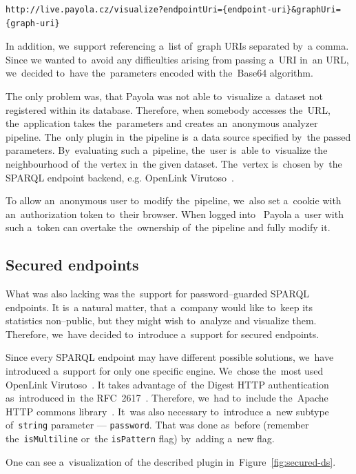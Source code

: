 {  \scriptsize
\begin{verbatim}
http://live.payola.cz/visualize?endpointUri={endpoint-uri}&graphUri={graph-uri}
\end{verbatim}
}

In addition, we~support referencing a~list of~graph URIs separated by~a comma. Since 
we wanted to~avoid any difficulties arising from passing a~URI in~an 
URL, we~decided to~have the~parameters encoded with the~Base64 algorithm.

The only problem was, that Payola was not able to~visualize a~dataset not registered
within its database. Therefore, when somebody accesses the~URL, the~application takes the~parameters and creates an~anonymous analyzer 
pipeline. The~only plugin in~the pipeline is~a data source specified by~the 
passed parameters. By~evaluating such a~pipeline, the~user is~able to~visualize 
the neighbourhood of~the vertex in~the given dataset. The~vertex is~chosen by~the 
SPARQL endpoint backend, e.g. OpenLink Virutoso~\cite{virtuoso}.

To allow an~anonymous user to~modify the~pipeline, we~also set a~cookie with an~authorization token to~their browser. When logged into~ 
Payola a~user with such a~token can overtake the~ownership of~the pipeline and 
fully modify it.

\subsection{Secured endpoints}
What was also lacking was the~support for password--guarded SPARQL endpoints. 
It is~a natural matter, that a~company would like to~keep its statistics 
non--public, but they might wish to~analyze and visualize them. Therefore, we~have decided to~introduce a~support for secured endpoints.

Since every SPARQL endpoint may have different possible solutions, we~have 
introduced a~support for only one specific engine. We~chose the~most
used OpenLink Virutoso~\cite{virtuoso}.
It takes advantage of~the Digest HTTP authentication as~introduced in~the 
RFC~2617~\cite{rfc-2617}. Therefore, we~had to~include the~Apache HTTP commons 
library~\cite{apache-http-commons}. It~was also necessary to~introduce a~new 
subtype of~\texttt{string} parameter --- \texttt{password}. That was done as~before (remember the~\texttt{isMultiline} or~the \texttt{isPattern} flag) by~adding a~new flag.

One can see a~visualization of~the described plugin in~Figure~\ref{fig:secured-ds}. 

